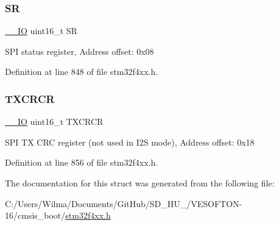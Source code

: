 \mbox{\label{struct_s_p_i___type_def_a44962ea5442d203bf4954035d1bfeb9d}} 
\subsubsection{\texorpdfstring{SR}{SR}}
{\footnotesize\ttfamily \hyperlink{group___c_m_s_i_s__core__definitions_gaec43007d9998a0a0e01faede4133d6be}{\+\_\+\+\_\+\+IO} uint16\+\_\+t SR}

S\+PI status register, Address offset\+: 0x08 

Definition at line 848 of file stm32f4xx.\+h.

\mbox{\label{struct_s_p_i___type_def_a0238d40f977d03709c97033b8379f98f}} 
\subsubsection{\texorpdfstring{T\+X\+C\+R\+CR}{TXCRCR}}
{\footnotesize\ttfamily \hyperlink{group___c_m_s_i_s__core__definitions_gaec43007d9998a0a0e01faede4133d6be}{\+\_\+\+\_\+\+IO} uint16\+\_\+t T\+X\+C\+R\+CR}

S\+PI TX C\+RC register (not used in I2S mode), Address offset\+: 0x18 

Definition at line 856 of file stm32f4xx.\+h.



The documentation for this struct was generated from the following file\+:\begin{DoxyCompactItemize}
\item 
C\+:/\+Users/\+Wilma/\+Documents/\+Git\+Hub/\+S\+D\+\_\+\+H\+U\+\_/\+V\+E\+S\+O\+F\+T\+O\+N-\/16/cmsis\+\_\+boot/\hyperlink{stm32f4xx_8h}{stm32f4xx.\+h}\end{DoxyCompactItemize}
